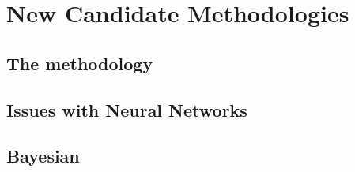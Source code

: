 
\chapter{New Candidate Methodologies}
\label{ch:gp}
\minitoc
\adjustmtc



\section[The NNPDF methodology]{The \nnpdf methodology}
\label{sec:gp/nnpdf}


\section{Issues with Neural Networks}
\label{sec:gp/issues}


\section{Bayesian \pdfs}
\label{sec:gp/bayes}

